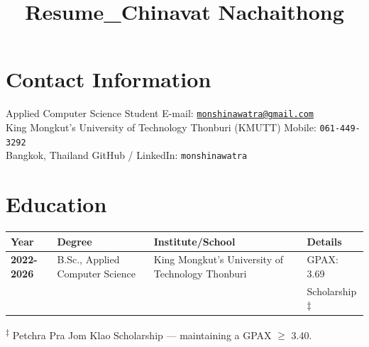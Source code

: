 \documentclass[margin,line]{resume}
\title{Resume_Chinavat Nachaithong}
\begin{document}
\begin{resume}

    \section{\mysidestyle \textbf{Contact Information}}

    Applied Computer Science Student \hfill E-mail: \texttt{\href{mailto:monshinawatra@gmail.com}{monshinawatra@gmail.com}} \\
    King Mongkut's University of Technology Thonburi (KMUTT) \hfill Mobile: \texttt{061-449-3292} \\
    Bangkok, Thailand \hfill GitHub / LinkedIn: \texttt{monshinawatra} \\
    
    \vspace{-4mm}       
    \section{\mysidestyle \textbf{Education}} 
    \vspace{-2mm}
    
    \noindent
    \begin{tabular}{@{} p{2cm} p{5cm} p{4.8cm} p{2.4cm} @{}}
    \toprule
    \textbf{Year} & \textbf{Degree} & \textbf{Institute/School} & \textbf{Details} \\ 
    \midrule
    \textbf{2022-2026} & B.Sc., Applied Computer Science & King Mongkut's University of Technology Thonburi & GPAX: 3.69 \\
                      &                                 &                                                  & Scholarship$\ddagger$ \\ 
    \bottomrule
    \end{tabular}
    \vspace{-3mm}
    
    \textsuperscript{$\ddagger$} Petchra Pra Jom Klao Scholarship --- maintaining a GPAX $\geq$ 3.40.
    \vspace{-3mm}

\end{resume}
\end{document}
